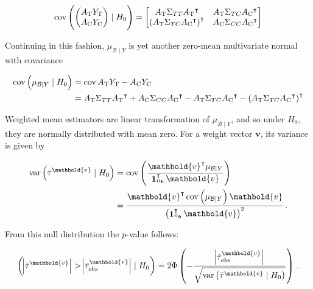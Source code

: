\documentclass[letter]{article}
\let\Pr\relax
\DeclareMathOperator{\Pr}{\mathbb{P}}
\DeclareMathOperator{\cov}{{cov}}
\DeclareMathOperator{\var}{{var}}
\DeclareMathOperator{\ones}{\mathbf{1}}
\newcommand{\trans}{^{\intercal}}
\newcommand{\treat}{\mathrm{T}}
\newcommand{\ctrol}{\mathrm{C}}
\newcommand{\vvec}{\mathbold{v}}
\newcommand{\boundary}{\mathcal{B}}
\newcommand{\sentinels}{\bm{b}}
\newcommand{\numsent}{n_{\sentinels}}
\begin{document}
\begin{equation}
    \cov \del{\begin{pmatrix}A_\treat{} Y_\treat{} \\ A_\ctrol{} Y_\ctrol{} \end{pmatrix} \mid H_0 } = \begin{bmatrix}
                        A_\treat{} \Sigma_{TT} A_\treat{}\trans & A_\treat{} \Sigma_{TC} A_\ctrol{}\trans \\
                        \del{A_\treat{} \Sigma_{TC} A_\ctrol{} \trans}\trans & A_\ctrol{} \Sigma_{CC} A_\ctrol{}\trans
                    \end{bmatrix}
\end{equation}

Continuing in this fashion, \(\mu_{\boundary \mid Y}\) is yet another zero-mean multivariate normal with covariance
    


    	\begin{equation}
\begin{split}
    \cov \del{\mu_{\boundary \mid Y} \mid H_0} &= \cov{ A_\treat{} Y_\treat{} - A_\ctrol{} Y_\ctrol{} } \\
        &= A_\treat{} \Sigma_{TT} A_\treat{}\trans + A_\ctrol{} \Sigma_{CC} A_\ctrol{}\trans - A_\treat{} \Sigma_{TC} A_\ctrol{}\trans -  \del{A_\treat{}\Sigma_{TC} A_\ctrol{}\trans}\trans
\end{split}
\end{equation}
    


    	Weighted mean estimators are linear transformation of \(\mu_{\boundary \mid Y}\), and so under \(H_0\), they are normally distributed with mean zero.
For a weight vector \(\vvec\), its variance is given by

\begin{equation}
\begin{aligned}
    \var\del{\bar{\tau}^\vvec \mid H_0} &= \cov\del{ \frac{\vvec \trans \mu_{\boundary \mid Y}}{\ones_{\numsent}\trans \vvec}} \\
    &= \frac{\vvec \trans \cov \del{\mu_{\boundary \mid Y}} \vvec}{\del{\ones_{\numsent}\trans \vvec}^2}
    \,.
\end{aligned}
\end{equation}
    


    	From this null distribution the \(p\)-value follows:

\begin{equation}
    \Pr\del{ \abs{\bar{\tau}^\vvec} > \abs{\bar{\tau}_{obs}^\vvec} \mid H_0} = 2 \Phi\del{ -\frac{\abs{\bar{\tau}_{obs}^\vvec}}{\sqrt{\var\del{\bar{\tau}^\vvec \mid H_0}}} }\,.
\end{equation}
\end{document}
